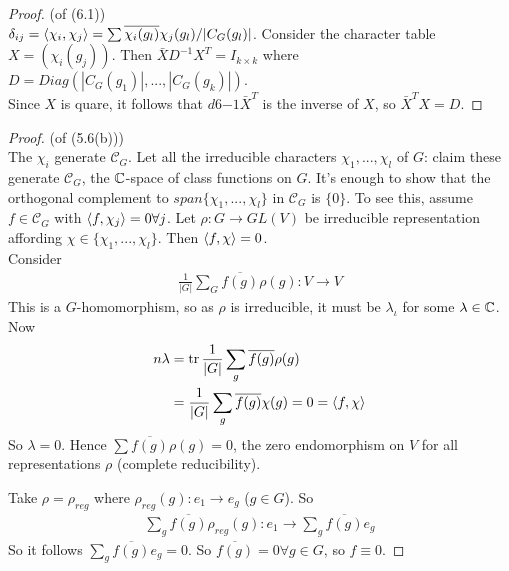 \documentclass[a4paper]{article}
\begin{document}
\begin{proof} (of (6.1))\\
$\delta_{ij} = \langle \chi_i,\chi_j\rangle = \sum \overline{\chi_i (g_l)} \chi_j (g_l) / |C_G(g_l)|$. Consider the character table $X = (\chi_i(g_j))$. Then $\bar{X} D^{-1} X^T = I_{k \times k}$ where $D = Diag(|C_G(g_1)|,...,|C_G(g_k)|)$.\\
Since $X$ is quare, it follows that $d6{-1} \bar{X}^T$ is the inverse of $X$, so $\bar{X}^T X = D$.
\end{proof}

\begin{proof} (of (5.6(b)))\\
The $\chi_i$ generate $\mathcal{C}_G$. Let all the irreducible characters $\chi_1,...,\chi_l$ of $G$: claim these generate $\mathcal{C}_G$, the $\mathbb{C}$-space of class functions on $G$. It's enough to show that the orthogonal complement to $span\{\chi_1,...,\chi_l\}$ in $\mathcal{C}_G$ is $\{0\}$. To see this, assume $f \in \mathcal{C}_G$ with $\langle f,\chi_j\rangle = 0 \forall j$. Let $\rho:G \to GL(V)$ be irreducible representation affording $\chi \in \{\chi_1,...,\chi_l\}$. Then $\langle f,\chi\rangle = 0$.\\
Consider
\begin{equation*}
\begin{aligned}
\frac{1}{|G|} \sum_G \overline{f(g)} \rho(g): V \to V
\end{aligned}
\end{equation*}
This is a $G$-homomorphism, so as $\rho$ is irreducible, it must be $\lambda_\iota$ for some $\lambda \in \mathbb{C}$. Now 
\begin{equation*}
\begin{aligned}
n\lambda &= \operatorname{tr} \frac{1}{|G|} \sum_g \overline{f(g)} \rho(g)\\
&= \frac{1}{|G|} \sum_g \overline{f(g)} \chi(g) = 0 = \langle f,\chi\rangle
\end{aligned}
\end{equation*}
So $\lambda = 0$. Hence $\sum \overline{f(g)} \rho(g) = 0$, the zero endomorphism on $V$ for all representations $\rho$ (complete reducibility).

Take $\rho = \rho_{reg}$ where $\rho_{reg}(g): e_1 \to e_g$ ($g \in G$). So
\begin{equation*}
\begin{aligned}
\sum_g \overline{f(g)} \rho_{reg}(g): e_1 \to \sum_g \overline{f(g)} e_g
\end{aligned}
\end{equation*}
So it follows $\sum_g \overline{f(g)} e_g = 0$. So $\overline{f(g)} = 0 \forall g \in G$, so $f \equiv 0$.
\end{proof}
\end{document}
